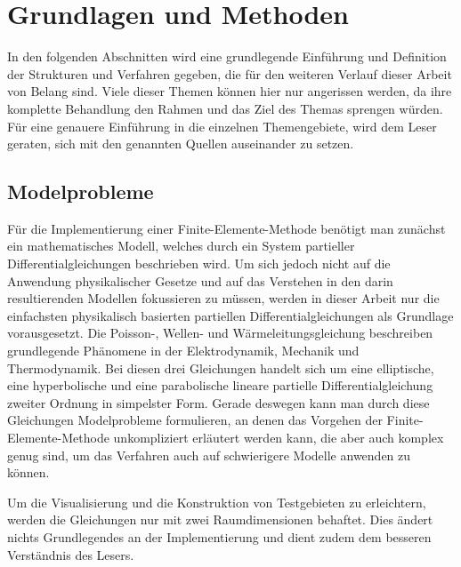 \documentclass[crop=false]{standalone}
\begin{document}
  \section{Grundlagen und Methoden} %
  \label{sec:background}

    In den folgenden Abschnitten wird eine grundlegende Einführung und Definition der Strukturen und Verfahren gegeben, die für den weiteren Verlauf dieser Arbeit von Belang sind.
    Viele dieser Themen können hier nur angerissen werden, da ihre komplette Behandlung den Rahmen und das Ziel des Themas sprengen würden.
    Für eine genauere Einführung in die einzelnen Themengebiete, wird dem Leser geraten, sich mit den genannten Quellen auseinander zu setzen.

    \subsection{Modelprobleme} %
    \label{sub:modelprobleme}
      \newcommand{\domain}{\ensuremath{\Omega}}
      \newcommand{\boundary}{\ensuremath{\partial\domain}}
      \newcommand{\neumannBoundary}{\ensuremath{\boundary_\mathrm{N}}}
      \newcommand{\dirichletBoundary}{\ensuremath{\boundary_\mathrm{D}}}

      Für die Implementierung einer Finite-Elemente-Methode benötigt man zunächst ein mathematisches Modell, welches durch ein System partieller Differentialgleichungen beschrieben wird.
      Um sich jedoch nicht auf die Anwendung physikalischer Gesetze und auf das Verstehen in den darin resultierenden Modellen fokussieren zu müssen, werden in dieser Arbeit nur die einfachsten physikalisch basierten partiellen Differentialgleichungen als Grundlage vorausgesetzt.
      Die Poisson-, Wellen- und Wärmeleitungsgleichung beschreiben grundlegende Phänomene in der Elektrodynamik, Mechanik und Thermodynamik.
      Bei diesen drei Gleichungen handelt sich um eine elliptische, eine hyperbolische und eine parabolische lineare partielle Differentialgleichung zweiter Ordnung in simpelster Form.
      Gerade deswegen kann man durch diese Gleichungen Modelprobleme formulieren, an denen das Vorgehen der Finite-Elemente-Methode unkompliziert erläutert werden kann, die aber auch komplex genug sind, um das Verfahren auch auf schwierigere Modelle anwenden zu können.
      \cite{Schweizer2013,Alberty1998,Logan2007}

      Um die Visualisierung und die Konstruktion von Testgebieten zu erleichtern, werden die Gleichungen nur mit zwei Raumdimensionen behaftet.
      Dies ändert nichts Grundlegendes an der Implementierung und dient zudem dem besseren Verständnis des Lesers.
\end{document}

